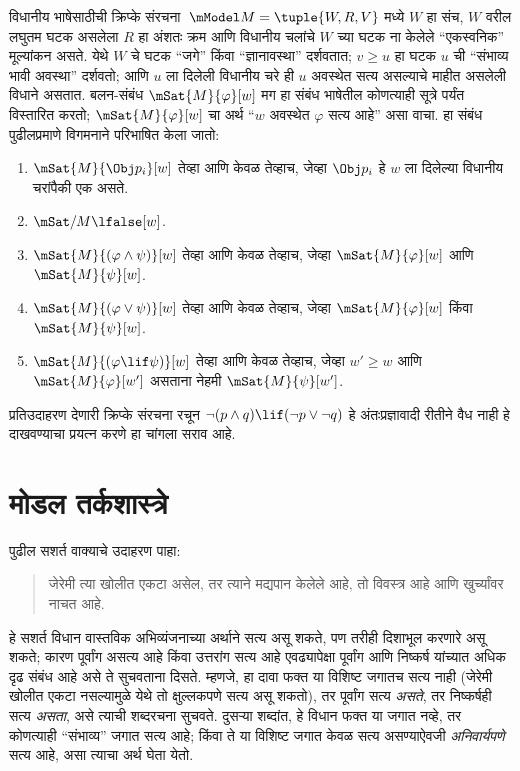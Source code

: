 विधानीय भाषेसाठीची क्रिप्के संरचना~$\mModel M = \tuple{W, R, V}$
मध्ये $W$ हा संच, $W$ वरील लघुतम घटक असलेला $R$ हा अंशतः क्रम आणि
विधानीय चलांचे $W$ च्या घटक ना केलेले “एकस्वनिक” मूल्यांकन असते.
येथे $W$ चे घटक “जगे” किंवा “ज्ञानावस्था” दर्शवतात; $v \geq u$ हा
घटक $u$ ची “संभाव्य भावी अवस्था” दर्शवतो; आणि $u$ ला दिलेली विधानीय चरे ही
$u$ अवस्थेत सत्य असल्याचे माहीत असलेली विधाने असतात. बलन-संबंध
$\mSat{M}{\varphi}[w]$ मग हा संबंध भाषेतील कोणत्याही सूत्रे पर्यंत
विस्तारित करतो; $\mSat{M}{\varphi}[w]$ चा अर्थ “$w$ अवस्थेत $\varphi$ सत्य आहे” असा
वाचा. हा संबंध पुढीलप्रमाणे विगमनाने परिभाषित केला जातो:
\begin{enumerate}
\item $\mSat{M}{\Obj p_i}[w]$ तेव्हा आणि केवळ तेव्हाच, जेव्हा $\Obj p_i$
  हे $w$ ला दिलेल्या विधानीय चरांपैकी एक असते.
\item $\mSat/{M}{\lfalse}[w]$.
\item $\mSat{M}{(\varphi \land \psi)}[w]$ तेव्हा आणि केवळ तेव्हाच, जेव्हा
  $\mSat{M}{\varphi}[w]$ आणि $\mSat{M}{\psi}[w]$.
\item $\mSat{M}{(\varphi \lor \psi)}[w]$ तेव्हा आणि केवळ तेव्हाच, जेव्हा
  $\mSat{M}{\varphi}[w]$ किंवा $\mSat{M}{\psi}[w]$.
\item $\mSat{M}{(\varphi \lif \psi)}[w]$ तेव्हा आणि केवळ तेव्हाच, जेव्हा
  $w' \geq w$ आणि $\mSat{M}{\varphi}[w']$ असताना नेहमी $\mSat{M}{\psi}[w']$.
\end{enumerate}
प्रतिउदाहरण देणारी क्रिप्के संरचना रचून $\lnot (p \land q) \lif
(\lnot p \lor \lnot q)$ हे अंतःप्रज्ञावादी रीतीने वैध नाही हे दाखवण्याचा
प्रयत्न करणे हा चांगला सराव आहे.












\section{मोडल तर्कशास्त्रे}\label{fol:byd:mod:sec}

पुढील सशर्त वाक्याचे उदाहरण पाहा:
\begin{quote}
  जेरेमी त्या खोलीत एकटा असेल, तर त्याने मद्यपान केलेले आहे, तो विवस्त्र आहे
  आणि खुर्च्यांवर नाचत आहे.
\end{quote}
हे सशर्त विधान वास्तविक अभिव्यंजनाच्या अर्थाने सत्य असू शकते, पण तरीही
दिशाभूल करणारे असू शकते; कारण पूर्वांग असत्य आहे किंवा उत्तरांग सत्य आहे
एवढ्यापेक्षा पूर्वांग
आणि निष्कर्ष यांच्यात अधिक दृढ संबंध आहे असे ते सुचवताना दिसते. म्हणजे, हा
दावा फक्त या विशिष्ट जगातच सत्य नाही (जेरेमी खोलीत एकटा नसल्यामुळे येथे तो
क्षुल्लकपणे सत्य असू शकतो), तर पूर्वांग सत्य \emph{असते}, तर निष्कर्षही सत्य
\emph{असता}, असे त्याची शब्दरचना सुचवते. दुसऱ्या शब्दांत, हे विधान फक्त या
जगात नव्हे, तर कोणत्याही “संभाव्य” जगात सत्य आहे; किंवा ते या विशिष्ट जगात
केवळ सत्य असण्याऐवजी \emph{अनिवार्यपणे} सत्य आहे, असा त्याचा अर्थ घेता येतो.

